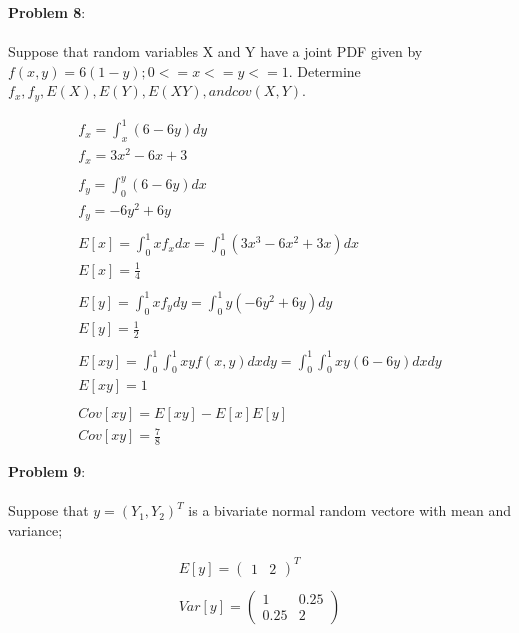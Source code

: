 \documentclass{exam}
\begin{document}
\pagebreak


\textbf{Problem 8}: 
\\
\\
Suppose that random variables X and Y have a joint PDF given by $ f(x,y) = 6(1-y);0<=x<=y<=1.$ Determine $f_x,f_y,E(X),E(Y),E(XY), and cov(X,Y)$.

 \begin{equation}
 \begin{gathered}
f_x = \int_{x}^{1}(6-6y) dy\\
f_x = 3x^2 -6x +3\\
\\ 
f_y = \int_{0}^{y}(6-6y) dx\\
f_y = -6y^2 +6y\\
\\
E[x] = \int_{0}^{1}xf_x dx = \int_{0}^{1}(3x^3 - 6x^2 +3x) dx\\
E[x] = \frac{1}{4}\\
\\
E[y] = \int_{0}^{1}xf_y dy = \int_{0}^{1}y(-6y^2 +6y)dy\\
E[y] = \frac{1}{2}\\
\\
E[xy] = \int_{0}^{1} \int_{0}^{1} xyf(x,y)dxdy = \int_{0}^{1} \int_{0}^{1} xy(6-6y)dx dy\\
E[xy] = 1\\
\\
Cov[xy] = E[xy]-E[x]E[y]\\
Cov[xy] = \frac{7}{8}
 \end{gathered}
 \end{equation}

\pagebreak

\textbf{Problem 9}:
\\
\\
Suppose that $y = (Y_1,Y_2)^T$ is a bivariate normal random vectore with mean and variance;

\begin{equation}
\begin{gathered}
E[y] = \begin{pmatrix} 1 & 2 \end{pmatrix}^T\\
\\
Var[y] = \begin{pmatrix} 1 & 0.25 \\ 0.25 & 2 \end{pmatrix}
\end{gathered}
\end{equation}
\end{document}
